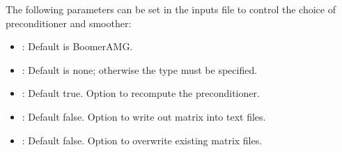 \documentclass[letterpaper,10pt,english]{sphinxmanual}
\begin{document}
\sphinxAtStartPar
The following parameters can be set in the inputs file to control the choice of preconditioner and smoother:
\begin{itemize}
\item {} 
\sphinxAtStartPar
{}:   Default is BoomerAMG.

\item {} 
\sphinxAtStartPar
{}: Default is none;  otherwise the type must be specified.

\item {} 
\sphinxAtStartPar
{}: Default true.  Option to recompute the preconditioner.

\item {} 
\sphinxAtStartPar
{}: Default false.   Option to write out matrix into text files.

\item {} 
\sphinxAtStartPar
{}: Default false.   Option to over\sphinxhyphen{}write existing matrix files.

\end{itemize}
\end{document}
